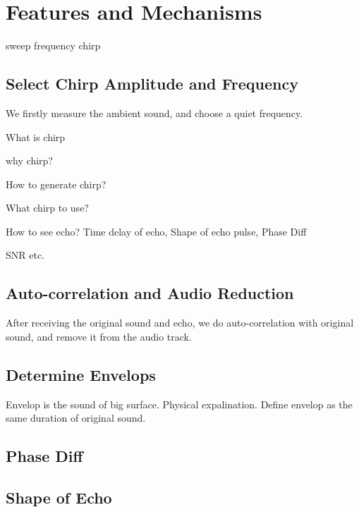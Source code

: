 \section{Features and Mechanisms}
\label{sec:mechanism}


sweep frequency chirp


\subsection{Select Chirp Amplitude and Frequency}

We firstly measure the ambient sound, and choose a quiet frequency.


What is chirp


why chirp?


How to generate chirp?


What chirp to use?


How to see echo? Time delay of echo, Shape of echo pulse, Phase Diff


SNR etc.



\subsection{Auto-correlation and Audio Reduction}

After receiving the original sound and echo, we do auto-correlation with original sound,
and remove it from the audio track.



\subsection{Determine Envelops}

Envelop is the sound of big surface. Physical expalination. 
Define envelop as the same duration of original sound.




\subsection{Phase Diff}



\subsection{Shape of Echo}



